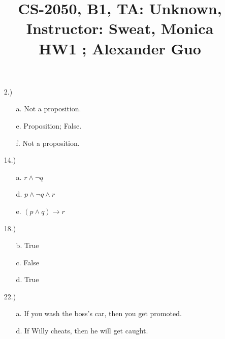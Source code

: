 \documentclass{article}
\title{\large{\vspace{-1.0cm}CS-2050, B1, TA: Unknown, Instructor: Sweat, Monica \\ HW1 ; Alexander Guo}}
\date{}
\begin{document}
\maketitle

\vspace{-1.5cm}

\begin{enumerate}

\item[2.)]

\begin{enumerate}

\item[a.] Not a proposition.

\item[e.] Proposition; False.

\item[f.] Not a proposition.

\end{enumerate}

\item[14.)] 

\begin{enumerate}

\item[a.] $r \wedge \neg q$

\item[d.] $p \wedge \neg q \wedge r$

\item[e.] $(p \wedge q) \rightarrow r$

\end{enumerate}

\item[18.)]

\begin{enumerate}

\item[b.] True

\item[c.] False

\item[d.] True

\end{enumerate}

\item[22.)]

\begin{enumerate}

\item[a.] If you wash the boss's car, then you get promoted.

\item[d.] If Willy cheats, then he will get caught.


\end{enumerate}
\end{enumerate}
\end{document}
